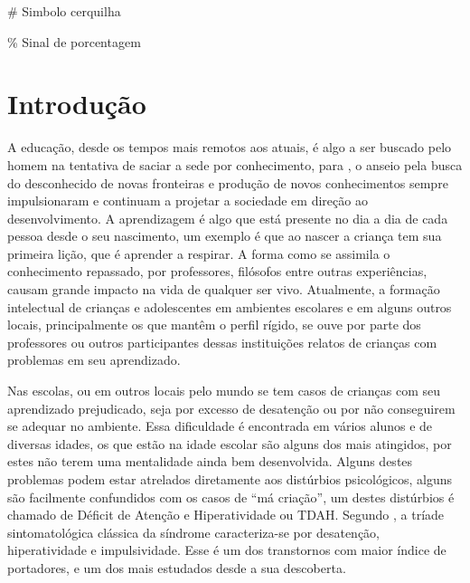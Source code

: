 \documentclass[
	12pt,				%
    oneside,			%
	a4paper,			%
	english,			%
	french,				%
	spanish,			%
	brazil,				%
	]{abntex2}
\begin{document}
\begin{simbolos}
  \item[\#] Simbolo cerquilha
  \item[\%] Sinal de porcentagem
\end{simbolos}


\tableofcontents*


\textual


\chapter{Introdução} %

	A educação, desde os tempos mais remotos aos atuais, é algo a ser buscado pelo homem na tentativa de saciar a sede por conhecimento, para , o anseio pela busca do desconhecido de novas fronteiras e produção de novos conhecimentos sempre impulsionaram e continuam a projetar a sociedade em direção ao desenvolvimento. A aprendizagem é algo que está presente no dia a dia de cada pessoa desde o seu nascimento, um exemplo é que ao nascer a criança tem sua primeira lição, que é aprender a respirar. A forma como se assimila o conhecimento repassado, por professores, filósofos entre outras experiências, causam grande impacto na vida de qualquer ser vivo. Atualmente, a formação intelectual de crianças e adolescentes em ambientes escolares e em alguns outros locais, principalmente os que mantêm o perfil rígido, se ouve por parte dos professores ou outros participantes dessas instituições relatos de crianças com problemas em seu aprendizado.
	
	Nas escolas, ou em outros locais pelo mundo se tem casos de crianças com seu aprendizado prejudicado, seja por excesso de desatenção ou por não conseguirem se adequar no ambiente. Essa dificuldade é encontrada em vários alunos e de diversas idades, os que estão na idade escolar são alguns dos mais atingidos, por estes não terem uma mentalidade ainda bem desenvolvida. Alguns destes problemas podem estar atrelados diretamente aos distúrbios psicológicos, alguns são facilmente confundidos com os casos de “má criação”, um destes distúrbios é chamado de Déficit de Atenção e Hiperatividade ou TDAH. Segundo , a tríade sintomatológica clássica da síndrome caracteriza-se por desatenção, hiperatividade e impulsividade. Esse é um dos transtornos com maior índice de portadores, e um dos mais estudados desde a sua descoberta.
		
\end{document}
